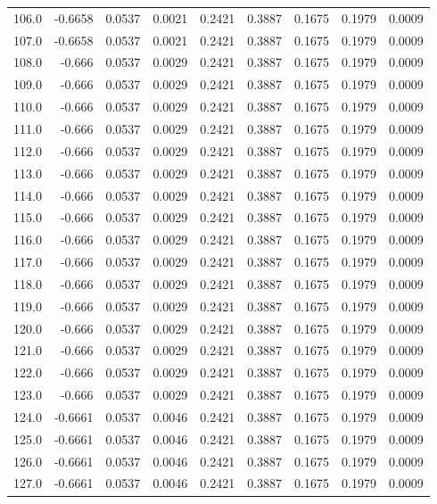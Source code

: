\begin{longtable}{lrrrrrrrr}
106.0 & -0.6658 & 0.0537 & 0.0021 & 0.2421 & 0.3887 & 0.1675 & 0.1979 & 0.0009 \\
107.0 & -0.6658 & 0.0537 & 0.0021 & 0.2421 & 0.3887 & 0.1675 & 0.1979 & 0.0009 \\
108.0 & -0.666 & 0.0537 & 0.0029 & 0.2421 & 0.3887 & 0.1675 & 0.1979 & 0.0009 \\
109.0 & -0.666 & 0.0537 & 0.0029 & 0.2421 & 0.3887 & 0.1675 & 0.1979 & 0.0009 \\
110.0 & -0.666 & 0.0537 & 0.0029 & 0.2421 & 0.3887 & 0.1675 & 0.1979 & 0.0009 \\
111.0 & -0.666 & 0.0537 & 0.0029 & 0.2421 & 0.3887 & 0.1675 & 0.1979 & 0.0009 \\
112.0 & -0.666 & 0.0537 & 0.0029 & 0.2421 & 0.3887 & 0.1675 & 0.1979 & 0.0009 \\
113.0 & -0.666 & 0.0537 & 0.0029 & 0.2421 & 0.3887 & 0.1675 & 0.1979 & 0.0009 \\
114.0 & -0.666 & 0.0537 & 0.0029 & 0.2421 & 0.3887 & 0.1675 & 0.1979 & 0.0009 \\
115.0 & -0.666 & 0.0537 & 0.0029 & 0.2421 & 0.3887 & 0.1675 & 0.1979 & 0.0009 \\
116.0 & -0.666 & 0.0537 & 0.0029 & 0.2421 & 0.3887 & 0.1675 & 0.1979 & 0.0009 \\
117.0 & -0.666 & 0.0537 & 0.0029 & 0.2421 & 0.3887 & 0.1675 & 0.1979 & 0.0009 \\
118.0 & -0.666 & 0.0537 & 0.0029 & 0.2421 & 0.3887 & 0.1675 & 0.1979 & 0.0009 \\
119.0 & -0.666 & 0.0537 & 0.0029 & 0.2421 & 0.3887 & 0.1675 & 0.1979 & 0.0009 \\
120.0 & -0.666 & 0.0537 & 0.0029 & 0.2421 & 0.3887 & 0.1675 & 0.1979 & 0.0009 \\
121.0 & -0.666 & 0.0537 & 0.0029 & 0.2421 & 0.3887 & 0.1675 & 0.1979 & 0.0009 \\
122.0 & -0.666 & 0.0537 & 0.0029 & 0.2421 & 0.3887 & 0.1675 & 0.1979 & 0.0009 \\
123.0 & -0.666 & 0.0537 & 0.0029 & 0.2421 & 0.3887 & 0.1675 & 0.1979 & 0.0009 \\
124.0 & -0.6661 & 0.0537 & 0.0046 & 0.2421 & 0.3887 & 0.1675 & 0.1979 & 0.0009 \\
125.0 & -0.6661 & 0.0537 & 0.0046 & 0.2421 & 0.3887 & 0.1675 & 0.1979 & 0.0009 \\
126.0 & -0.6661 & 0.0537 & 0.0046 & 0.2421 & 0.3887 & 0.1675 & 0.1979 & 0.0009 \\
127.0 & -0.6661 & 0.0537 & 0.0046 & 0.2421 & 0.3887 & 0.1675 & 0.1979 & 0.0009 \\

\end{longtable}
